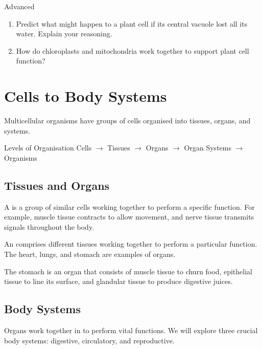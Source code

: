 \begin{tieredquestions}{Advanced}
\begin{enumerate}
    \item Predict what might happen to a plant cell if its central vacuole lost all its water. Explain your reasoning.
    \item How do chloroplasts and mitochondria work together to support plant cell function?
\end{enumerate}
\end{tieredquestions}

\section{Cells to Body Systems}

Multicellular organisms have groups of cells organised into tissues, organs, and systems. 

\begin{keyconcept}{Levels of Organisation}
Cells $\rightarrow$ Tissues $\rightarrow$ Organs $\rightarrow$ Organ Systems $\rightarrow$ Organisms
\end{keyconcept}

\subsection{Tissues and Organs}

A  is a group of similar cells working together to perform a specific function. For example, muscle tissue contracts to allow movement, and nerve tissue transmits signals throughout the body.

An  comprises different tissues working together to perform a particular function. The heart, lungs, and stomach are examples of organs.

\begin{example}
The stomach is an organ that consists of muscle tissue to churn food, epithelial tissue to line its surface, and glandular tissue to produce digestive juices.
\end{example}

\subsection{Body Systems}

Organs work together in  to perform vital functions. We will explore three crucial body systems: digestive, circulatory, and reproductive.

